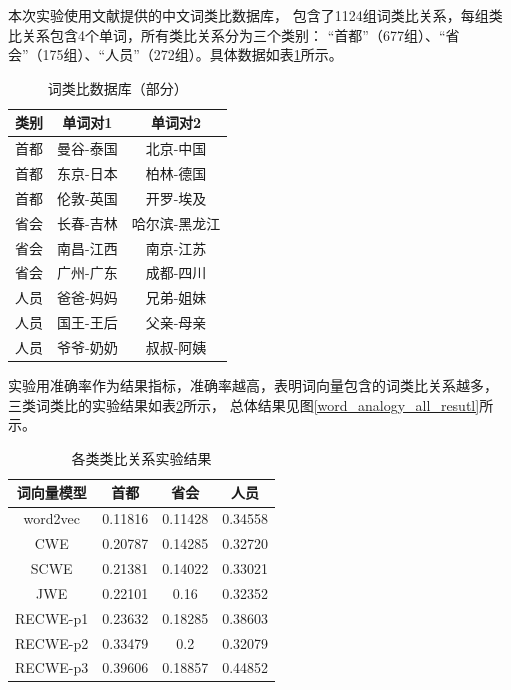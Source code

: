本次实验使用文献\cite{chen2015joint}提供的中文词类比数据库，
包含了1124组词类比关系，每组类比关系包含4个单词，所有类比关系分为三个类别：
“首都”（677组）、“省会”（175组）、“人员”（272组）。具体数据如表\ref{word_analogy_table}所示。
\begin{table}[ht]
    \caption{词类比数据库（部分）}
    \begin{tabular}{|c|c|c|}
        \hline
        类别 & 单词对1 & 单词对2 \\
        \hline
        首都 & 曼谷-泰国 & 北京-中国 \\
        \hline
        首都 & 东京-日本 & 柏林-德国 \\
        \hline
        首都 & 伦敦-英国 & 开罗-埃及 \\
        \hline
        省会 & 长春-吉林 & 哈尔滨-黑龙江 \\
        \hline
        省会 & 南昌-江西 & 南京-江苏 \\
        \hline
        省会 & 广州-广东 & 成都-四川 \\
        \hline
        人员 & 爸爸-妈妈 & 兄弟-姐妹 \\
        \hline
        人员 & 国王-王后 &  父亲-母亲\\
        \hline
        人员 & 爷爷-奶奶 & 叔叔-阿姨 \\
        \hline
    \end{tabular}
    \label{word_analogy_table}
    \end{table}

实验用准确率作为结果指标，准确率越高，表明词向量包含的词类比关系越多，
三类词类比的实验结果如表\ref{word_analogy_resutl}所示，
总体结果见图\ref{word_analogy_all_resutl}所示。
\begin{table}[ht]
    \caption{各类类比关系实验结果}
    \begin{tabular}{|c|c|c|c|}
        \hline
        词向量模型 & 首都 & 省会 & 人员 \\
        \hline
        word2vec & 0.11816 & 0.11428 & 0.34558 \\
        \hline
        CWE & 0.20787 & 0.14285 & 0.32720 \\
        \hline
        SCWE & 0.21381 & 0.14022 & 0.33021 \\
        \hline
        JWE & 0.22101 & 0.16 & 0.32352 \\
        \hline
        RECWE-p1 & 0.23632 & 0.18285 & 0.38603 \\
        \hline
        RECWE-p2 & 0.33479 & 0.2 & 0.32079 \\
        \hline
        RECWE-p3 & 0.39606 & 0.18857 & 0.44852 \\
        \hline
    \end{tabular}
    \label{word_analogy_resutl}
    \end{table}

